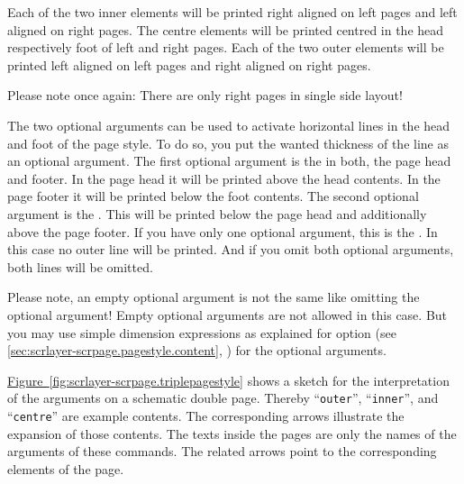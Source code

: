 Each of the two inner elements will be printed right aligned on left pages and
left aligned on right pages. The centre elements will be printed centred in
the head respectively foot of left and right pages. Each of the two outer
elements will be printed left aligned on left pages and right aligned on right
pages.

Please note once again: There are only right pages in
single side layout!

The two optional arguments can be used to activate horizontal lines in the
head and foot of the page style. To do so, you put the wanted thickness of the
line as an optional argument. The first optional argument is the
 in both, the page head and footer. In the
page head it will be printed above the head contents. In the page footer it
will be printed below the foot contents. The second optional argument is the
. This will be printed below the page head
and additionally above the page footer. If you have only one optional
argument, this is the . In this case no
outer line will be printed. And if you omit both optional arguments, both
lines will be omitted.

Please note, an empty optional argument is not the same
like omitting the optional argument! Empty optional arguments are not allowed
in this case. But you may use simple dimension expressions as explained for
\KOMAScript{} option  (see
\autoref{sec:scrlayer-scrpage.pagestyle.content},
) for the optional
arguments.

\hyperref[fig:scrlayer-scrpage.triplepagestyle]%
{Figure~\ref*{fig:scrlayer-scrpage.triplepagestyle}} shows a sketch for the
interpretation of the arguments on a schematic double page. Thereby
``\texttt{outer}'', ``\texttt{inner}'', and ``\texttt{centre}'' are example
contents. The corresponding arrows illustrate the expansion of those
contents. The texts inside the pages are only the names of
the arguments of these commands. The related arrows  point to the corresponding elements of the page.

